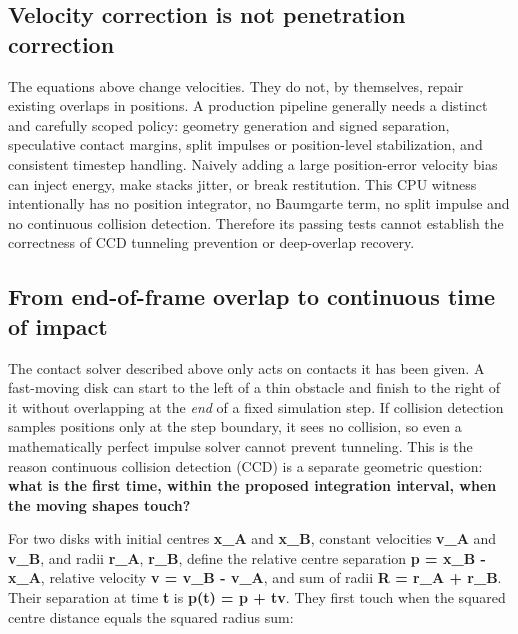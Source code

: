 \subsection{Velocity correction is not penetration correction}\label{appendix-c9d92e145503-velocity-correction-is-not-penetration-correction}

\hypertarget{appendix-c9d92e145503-velocity-correction-is-not-penetration-correction}{}

The equations above change velocities. They do not, by themselves, repair existing overlaps in positions. A production pipeline generally needs a distinct and carefully scoped policy: geometry generation and signed separation, speculative contact margins, split impulses or position-level stabilization, and consistent timestep handling. Naively adding a large position-error velocity bias can inject energy, make stacks jitter, or break restitution. This CPU witness intentionally has no position integrator, no Baumgarte term, no split impulse and no continuous collision detection. Therefore its passing tests cannot establish the correctness of CCD tunneling prevention or deep-overlap recovery.

\subsection{From end-of-frame overlap to continuous time of impact}\label{appendix-c9d92e145503-from-end-of-frame-overlap-to-continuous-time-of-impact}

\hypertarget{appendix-c9d92e145503-from-end-of-frame-overlap-to-continuous-time-of-impact}{}

The contact solver described above only acts on contacts it has been given. A fast-moving disk can start to the left of a thin obstacle and finish to the right of it without overlapping at the \emph{end} of a fixed simulation step. If collision detection samples positions only at the step boundary, it sees no collision, so even a mathematically perfect impulse solver cannot prevent tunneling. This is the reason continuous collision detection (CCD) is a separate geometric question: \textbf{what is the first time, within the proposed integration interval, when the moving shapes touch?}

For two disks with initial centres \textbf{x\_A} and \textbf{x\_B}, constant velocities \textbf{v\_A} and \textbf{v\_B}, and radii \textbf{r\_A}, \textbf{r\_B}, define the relative centre separation \textbf{p = x\_B - x\_A}, relative velocity \textbf{v = v\_B - v\_A}, and sum of radii \textbf{R = r\_A + r\_B}. Their separation at time \textbf{t} is \textbf{p(t) = p + tv}. They first touch when the squared centre distance equals the squared radius sum:


